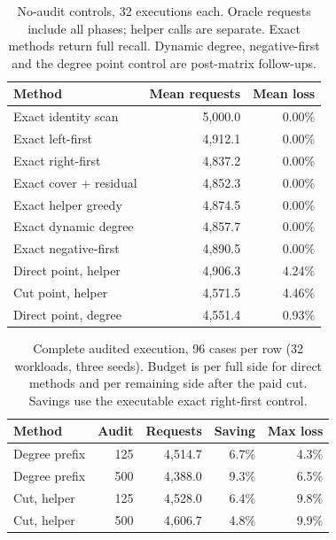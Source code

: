 \begin{table}[t]
\centering
\caption{No-audit controls, 32 executions each. Oracle requests include all phases; helper calls are separate. Exact methods return full recall. Dynamic degree, negative-first and the degree point control are post-matrix follow-ups.}
\label{tab:exact}
\renewcommand{\arraystretch}{1.08}
\begin{tabularx}{\linewidth}{Xrr}
\toprule
\textbf{Method} & \textbf{Mean requests} & \textbf{Mean loss} \\
\midrule
Exact identity scan & 5,000.0 & 0.00\% \\
Exact left-first & 4,912.1 & 0.00\% \\
Exact right-first & 4,837.2 & 0.00\% \\
Exact cover + residual & 4,852.3 & 0.00\% \\
Exact helper greedy & 4,874.5 & 0.00\% \\
Exact dynamic degree & 4,857.7 & 0.00\% \\
Exact negative-first & 4,890.5 & 0.00\% \\
Direct point, helper & 4,906.3 & 4.24\% \\
Cut point, helper & 4,571.5 & 4.46\% \\
Direct point, degree & 4,551.4 & 0.93\% \\
\bottomrule
\end{tabularx}
\end{table}

\begin{table}[t]
\centering
\caption{Complete audited execution, 96 cases per row (32 workloads, three seeds). Budget is per full side for direct methods and per remaining side after the paid cut. Savings use the executable exact right-first control.}
\label{tab:audited}
\renewcommand{\arraystretch}{1.08}
\begin{tabularx}{\linewidth}{Xrrrr}
\toprule
\textbf{Method} & \textbf{Audit} & \textbf{Requests} & \textbf{Saving} & \textbf{Max loss} \\
\midrule
Degree prefix & 125 & 4,514.7 & 6.7\% & 4.3\% \\
Degree prefix & 500 & 4,388.0 & 9.3\% & 6.5\% \\
Cut, helper & 125 & 4,528.0 & 6.4\% & 9.8\% \\
Cut, helper & 500 & 4,606.7 & 4.8\% & 9.9\% \\
\bottomrule
\end{tabularx}
\end{table}
